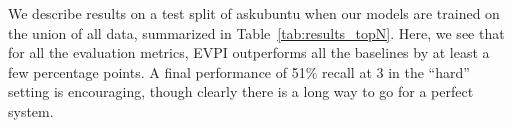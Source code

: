 \documentclass[11pt,a4paper]{article}
\begin{document}
We describe results on a test split of askubuntu when our models are trained on the union of all data, summarized in Table~\ref{tab:results_topN}. Here, we see that for all the evaluation metrics, EVPI outperforms all the baselines by at least a few percentage points. A final performance of 51\% recall at 3 in the ``hard'' setting is encouraging, though clearly there is a long way to go for a perfect system. 




\end{document}
